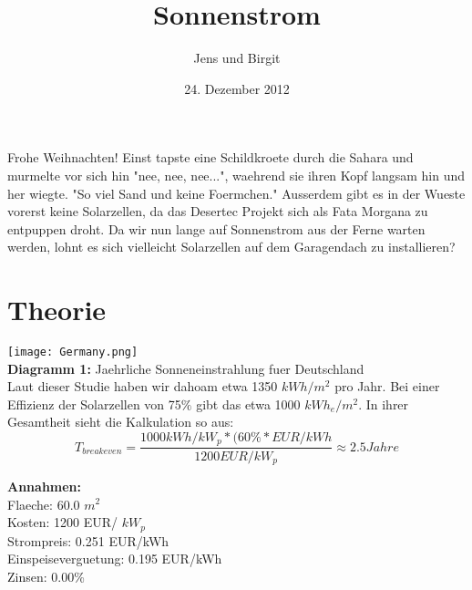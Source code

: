 \documentclass[11pt]{article} %
\title{Sonnenstrom}
\author{Jens und Birgit}
\date{24. Dezember 2012} %
\begin{document}
\maketitle

\long{}

\noindent Frohe Weihnachten! Einst tapste eine Schildkroete durch die Sahara und murmelte vor sich hin "nee, nee, nee...", waehrend sie ihren Kopf langsam hin und her wiegte. "So viel Sand und keine Foermchen." Ausserdem gibt es in der Wueste vorerst keine Solarzellen, da das Desertec Projekt sich als Fata Morgana zu entpuppen droht. Da wir nun lange auf Sonnenstrom aus der Ferne warten werden, lohnt es sich vielleicht Solarzellen auf dem Garagendach zu installieren?

\section{Theorie}


\texttt{[image: Germany.png]}\\
\textbf{Diagramm 1:} Jaehrliche Sonneneinstrahlung fuer Deutschland\\

\noindent Laut dieser Studie haben wir dahoam etwa 1350 $kWh/m^2$ pro Jahr. Bei einer Effizienz der Solarzellen von 75$\%$ gibt das etwa 1000 $kWh_e/m^2$. In ihrer Gesamtheit sieht die Kalkulation so aus: \\

\begin{equation}
T_{breakeven}= \frac{1000 kWh/kW_p *  (60\%* EUR/kWh} {1200 EUR/kW_p}  \approx 2.5 Jahre
\end{equation}


\noindent\textbf{Annahmen:}\\
Flaeche: 60.0 $m^2$\\
Kosten: 1200 EUR/ $kW_p$\\
Strompreis:  0.251 EUR/kWh\\
Einspeiseverguetung: 0.195 EUR/kWh \\
Zinsen: 0.00\%\\
\end{document}
